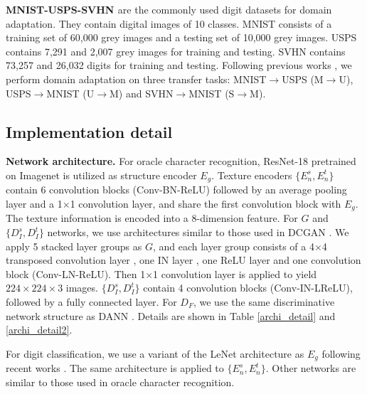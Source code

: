 \documentclass[10pt,journal,compsoc,twocolumn ]{IEEEtran}
\begin{document}
\textbf{MNIST-USPS-SVHN \cite{lecun1998gradient,netzer2011reading,denker1989neural}} are the commonly used digit datasets for domain adaptation. They contain digital images of 10 classes. MNIST consists of a training set of 60,000 grey images and a testing set of 10,000 grey images. USPS contains 7,291 and 2,007 grey images for training and testing. SVHN contains 73,257 and 26,032 digits for training and testing. Following previous works \cite{hoffman2018cycada}, we perform domain adaptation on three transfer tasks: MNIST$\rightarrow$USPS (M$\rightarrow$U), USPS$\rightarrow$MNIST (U$\rightarrow$M) and SVHN$\rightarrow$MNIST (S$\rightarrow$M).

\subsection{Implementation detail}

\textbf{Network architecture.} For oracle character recognition, ResNet-18 \cite{he2016deep} pretrained on Imagenet \cite{russakovsky2015imagenet} is utilized as structure encoder $E_g$. Texture encoders $\{E_n^s, E_n^t\}$ contain 6 convolution blocks (Conv-BN-ReLU) followed by an average pooling layer and a 1$\times $1 convolution layer, and share the first convolution block with $E_g$. The texture information is encoded into a 8-dimension feature. For $G$ and $\{D_I^s,D_I^t\}$ networks, we use architectures similar to those used in DCGAN \cite{radford2015unsupervised}. We apply 5 stacked layer groups as $G$, and each layer group consists of a 4$\times $4 transposed convolution layer \cite{dumoulin2016guide}, one IN layer \cite{ulyanov2016instance}, one ReLU layer and one convolution block (Conv-LN-ReLU). Then 1$\times $1 convolution layer is applied to yield $224\times 224\times 3$ images. $\{D_I^s,D_I^t\}$ contain 4 convolution blocks (Conv-IN-LReLU), followed by a fully connected layer. For $D_F$, we use the same discriminative network structure as DANN \cite{Ganin2015Unsupervised}. Details are shown in Table \ref{archi_detail} and \ref{archi_detail2}.

For digit classification, we use a variant of the LeNet architecture as $E_g$ following recent works \cite{hoffman2018cycada,long2018conditional}. The same architecture is applied to $\{E_n^s, E_n^t\}$. Other networks are similar to those used in oracle character recognition.
\end{document}
